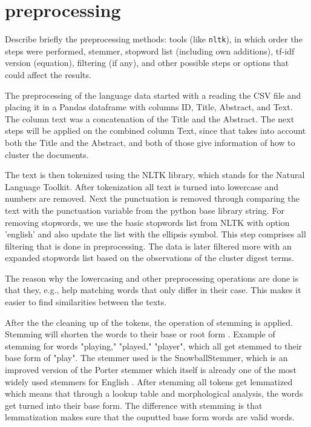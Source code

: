 \section{preprocessing}


Describe briefly the preprocessing methods: tools (like \texttt{nltk}), in which order the steps were performed, stemmer, stopword list (including own additions), tf-idf version (equation), filtering (if any), and other possible steps or options that could affect the results.



The preprocessing of the language data started with a reading the CSV file and placing it in a Pandas dataframe with columns ID, Title, Abstract, and Text. The column text was a concatenation of the Title and the Abstract. The next steps will be applied on the combined column Text, since that takes into account both the Title and the Abstract, and both of those give information of how to cluster the documents.

The text is then tokenized using the NLTK library, which stands for the Natural Language Toolkit. After tokenization all text is turned into lowercase and numbers are removed. Next the punctuation is removed through comparing the text with the punctuation variable from the python base library string. For removing stopwords, we use the basic stopwords list from NLTK with option 'english' and also update the list with the ellipsis symbol. This step comprises all filtering that is done in preprocessing. The data is later filtered more with an expanded stopwords list based on the observations of the cluster digest terms.



The reason why the lowercasing and other preprocessing operations are done is that they, e.g., help matching words that only differ in their case. This makes it easier to find similarities between the texts.


After the the cleaning up of the tokens, the operation of stemming is applied. Stemming will shorten the words to their base or root form \autocite{aggarwal2015data}. Example of stemming for words "playing," "played," "player", which all get stemmed to their base form of "play". The stemmer used is the SnowballStemmer, which is an improved version of the Porter stemmer which itself is already one of the most widely used stemmers for English \autocite{porter1980algorithm}. After stemming all tokens get lemmatized which means that through a lookup table and morphological analysis, the words get turned into their base form. The difference with stemming is that lemmatization makes sure that the ouputted base form words are valid words.

